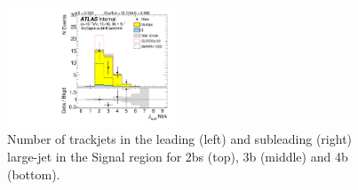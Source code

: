 \begin{figure}[htbp!]
\begin{center}
\includegraphics[width=0.45\textwidth,angle=-90]{figures/boosted/Signal/b77_FourTag_Signal_sublHCand_ntrk.pdf}
  \caption{Number of trackjets in the leading (left) and subleading (right) large-\R jet in the Signal region for 2bs (top), 3b (middle) and 4b (bottom).}
  \label{fig:boosted-ntrk-Signal}
\end{center}
\end{figure}